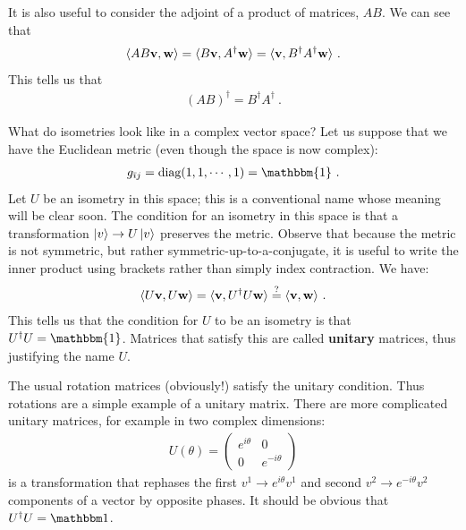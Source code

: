 It is also useful to consider the adjoint of a product of matrices, $AB$. We can see that
\begin{align}
    \langle AB \mathbf{v}, \mathbf{w} \rangle
    =
    \langle B \mathbf{v},  A^\dag \mathbf{w} \rangle
    =
    \langle \mathbf{v}, B^\dag A^\dag \mathbf{w} \rangle \ .
\end{align}
This tells us that
\begin{align}
    (AB)^\dag = B^\dag A^\dag \ .
    \label{eq:adjoint:of:product}
\end{align}



\begin{example} What do isometries look like in a complex vector space? Let us suppose that we have the Euclidean metric (even though the space is now complex):
\begin{align}
    g_{\bar\imath j} = \text{diag}(1,1,\cdots, 1) = \mathbbm{1} \ .
\end{align}
Let $U$ be an isometry in this space; this is a conventional name whose meaning will be clear soon. The condition for an isometry in this space is that a transformation $\left|v\right\rangle \to U\left|v\right\rangle$ preserves the metric. Observe that because the metric is not symmetric, but rather symmetric-up-to-a-conjugate, it is useful to write the inner product using brackets rather than simply index contraction. We have:
\begin{align}
    \langle U\mathbf{v}, U\mathbf{w} \rangle = \langle \mathbf{v}, U^\dag U \mathbf{w} \rangle \stackrel{?}{=} \langle \mathbf{v}, \mathbf{w} \rangle \ .
\end{align}
This tells us that the condition for $U$ to be an isometry is that $U^\dag U = \mathbbm{1}$. Matrices that satisfy this are called \textbf{unitary} matrices, thus justifying the name $U$. 
\end{example}

\begin{example}
The usual rotation matrices (obviously!) satisfy the unitary condition. Thus rotations are a simple example of a unitary matrix. There are more complicated unitary matrices, for example in two complex dimensions:
\begin{align}
    U(\theta) = 
    \begin{pmatrix}
        e^{i\theta} & 0\\
        0 & e^{-i\theta}
    \end{pmatrix}
    \label{eg:unitary:matrix:diagonal}
\end{align}
is a transformation that rephases the first $v^1 \to e^{i\theta}v^1$  and second $v^2 \to e^{-i\theta}v^2$ components of a vector by opposite phases. It should be obvious that $U^\dag U = \one$. 
\end{example}


